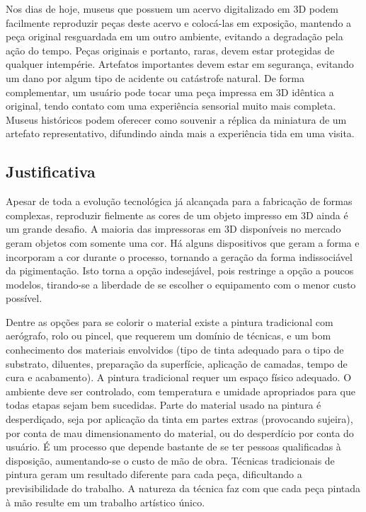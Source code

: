 Nos dias de hoje, museus que possuem um acervo digitalizado em 3D podem facilmente reproduzir peças deste acervo e colocá-las em exposição, mantendo a peça original resguardada em um outro ambiente, evitando a degradação pela ação do tempo. Peças originais e portanto, raras, devem estar protegidas de qualquer intempérie. Artefatos importantes devem estar em segurança, evitando um dano por algum tipo de acidente ou catástrofe natural. De forma complementar, um usuário pode tocar uma peça impressa em 3D idêntica a original, tendo contato com uma experiência sensorial muito mais completa. Museus históricos podem oferecer como souvenir a réplica da miniatura de um artefato representativo, difundindo ainda mais a experiência tida em uma visita.

\subsection{Justificativa}

Apesar de toda a evolução tecnológica já alcançada para a fabricação de formas complexas, reproduzir fielmente as cores de um objeto impresso em 3D ainda é um grande desafio. A maioria das impressoras em 3D disponíveis no mercado geram objetos com somente uma cor. Há alguns dispositivos que geram a forma e incorporam a cor durante o processo, tornando a  geração da forma indissociável da pigimentação. Isto torna a opção indesejável, pois restringe a opção a poucos modelos, tirando-se a liberdade de se escolher o equipamento com o menor custo possível.

Dentre as opções para se colorir o material existe a pintura tradicional com aerógrafo, rolo ou pincel, que requerem um domínio de técnicas, e um bom conhecimento dos materiais envolvidos (tipo de tinta adequado para o tipo de substrato, diluentes, preparação da superfície, aplicação de camadas, tempo de cura e acabamento). A pintura tradicional requer um espaço físico adequado. O ambiente deve ser controlado, com temperatura e umidade apropriados para que todas etapas sejam bem sucedidas. Parte do material usado na pintura é desperdiçado, seja por aplicação da tinta em partes extras (provocando sujeira), por conta de mau dimensionamento do material, ou do desperdício por conta do usuário. É um processo que depende bastante de se ter pessoas qualificadas à disposição, aumentando-se o custo de mão de obra. Técnicas tradicionais de pintura geram um resultado diferente para cada peça, dificultando a previsibilidade do trabalho. A natureza da técnica faz com que cada peça pintada à mão resulte em um trabalho artístico único. 

